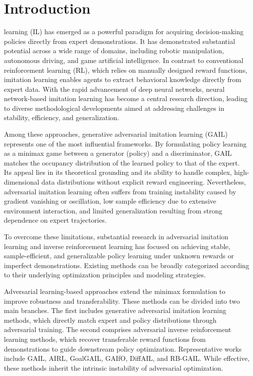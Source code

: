 \documentclass[lettersize,journal]{IEEEtran}
\begin{document}
\section{Introduction}
 learning (IL) has emerged as a powerful paradigm for acquiring decision-making policies directly from expert demonstrations. It has demonstrated substantial potential across a wide range of domains, including robotic manipulation, autonomous driving, and game artificial intelligence. In contrast to conventional reinforcement learning (RL), which relies on manually designed reward functions, imitation learning enables agents to extract behavioral knowledge directly from expert data. With the rapid advancement of deep neural networks, neural network-based imitation learning has become a central research direction, leading to diverse methodological developments aimed at addressing challenges in stability, efficiency, and generalization.

Among these approaches, generative adversarial imitation learning (GAIL) represents one of the most influential frameworks. By formulating policy learning as a minimax game between a generator (policy) and a discriminator, GAIL matches the occupancy distribution of the learned policy to that of the expert. Its appeal lies in its theoretical grounding and its ability to handle complex, high-dimensional data distributions without explicit reward engineering. Nevertheless, adversarial imitation learning often suffers from training instability caused by gradient vanishing or oscillation, low sample efficiency due to extensive environment interaction, and limited generalization resulting from strong dependence on expert trajectories.

To overcome these limitations, substantial research in adversarial imitation learning and inverse reinforcement learning has focused on achieving stable, sample-efficient, and generalizable policy learning under unknown rewards or imperfect demonstrations. Existing methods can be broadly categorized according to their underlying optimization principles and modeling strategies.

Adversarial learning-based approaches extend the minimax formulation to improve robustness and transferability. These methods can be divided into two main branches. The first includes generative adversarial imitation learning methods, which directly match expert and policy distributions through adversarial training. The second comprises adversarial inverse reinforcement learning methods, which recover transferable reward functions from demonstrations to guide downstream policy optimization. Representative works include GAIL, AIRL, GoalGAIL, GAIfO, DiffAIL, and RB-GAIL. While effective, these methods inherit the intrinsic instability of adversarial optimization.
\end{document}
